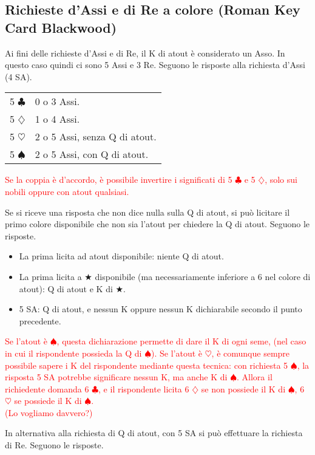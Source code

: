\documentclass[a4paper,10pt]{article}
\renewcommand{\c}{$\clubsuit$\xspace}
\renewcommand{\d}{$\diamondsuit$\xspace}
\newcommand{\h}{$\heartsuit$\xspace}
\newcommand{\s}{$\spadesuit$\xspace}
\renewcommand{\j}{$\bigstar$\xspace}
\newcommand{\sa}{SA\xspace}
\newcommand{\smallspace}{\vskip0.3cm}
\newcommand{\note}[1]{\textcolor{red}{#1}}
\newenvironment{twocol}
  {\smallspace\noindent\begin{tabular}{l p{0.78\textwidth}}}
  {\end{tabular}\smallspace}
\begin{document}
\subsection{Richieste d'Assi e di Re a colore (Roman Key Card Blackwood)}

Ai fini delle richieste d'Assi e di Re, il K di atout è considerato un Asso. In questo caso quindi ci sono 5 Assi e 3 Re. Seguono le risposte alla richiesta d'Assi (4 \sa).

\begin{twocol}
5 \c & 0 o 3 Assi.\\
5 \d & 1 o 4 Assi.\\
5 \h & 2 o 5 Assi, senza Q di atout.\\
5 \s & 2 o 5 Assi, con Q di atout.\\
\end{twocol}

\note{Se la coppia è d'accordo, è possibile invertire i significati di 5 \c e 5 \d, solo sui nobili oppure con atout qualsiasi.}

Se si riceve una risposta che non dice nulla sulla Q di atout, si può licitare il primo colore disponibile che non sia l'atout per chiedere la Q di atout. Seguono le risposte.

\begin{itemize}
 \item La prima licita ad atout disponibile: niente Q di atout.
 \item La prima licita a \j disponibile (ma necessariamente inferiore a 6 nel colore di atout): Q di atout e K di \j.
 \item 5 \sa: Q di atout, e nessun K oppure nessun K dichiarabile secondo il punto precedente.
\end{itemize}

\note{Se l'atout è \s, questa dichiarazione permette di dare il K di ogni seme, (nel caso in cui il rispondente possieda la Q di \s). Se l'atout è \h, è comunque sempre possibile sapere i K del rispondente mediante questa tecnica: con richiesta 5 \s, la risposta 5 \sa potrebbe significare nessun K, ma anche K di \s.
Allora il richiedente domanda 6 \c, e il rispondente licita 6 \d se non possiede il K di \s, 6 \h se possiede il K di \s.\\
(Lo vogliamo davvero?)}

\smallspace

In alternativa alla richiesta di Q di atout, con 5 \sa si può effettuare la richiesta di Re. Seguono le risposte.
\end{document}
